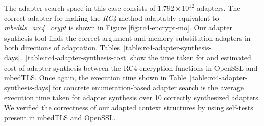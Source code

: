 The adapter search space in this case consists of $1.792 \times 10^{12}$ adapters.
%
The correct adapter for making the \textit{RC4} method adaptably
equivalent to \textit{mbedtls\_arc4\_crypt} is shown in Figure
\ref{fig:rc4-encrypt-mo}.
%
Our adapter synthesis tool finds the correct argument and memory
substitution adapters in both directions of adaptation.
%
Tables~\ref{table:rc4-adapter-synthesis-days},~\ref{table:rc4-adapter-synthesis-cost}
show the time taken for and estimated cost of adapter synthesis between
the RC4 encryption functions in OpenSSL and mbedTLS.
%
Once again, the execution time shown in Table~\ref{table:rc4-adapter-synthesis-days}
for concrete enumeration-based adapter search is the average execution time
taken for adapter synthesis over 10 correctly synthesized adapters.
%
We verified the correctness of our adapted context structures by using self-tests present in mbedTLS and OpenSSL.
%
%
\noindent
